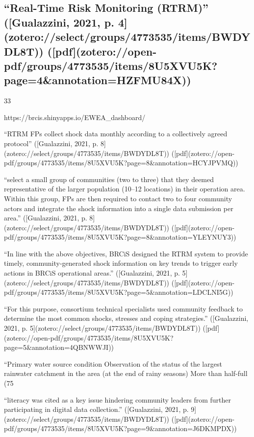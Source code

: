 {\subsection{“Real-Time Risk Monitoring (RTRM)” ([Gualazzini, 2021, p. 4](zotero://select/groups/4773535/items/BWDYDL8T)) ([pdf](zotero://open-pdf/groups/4773535/items/8U5XVU5K?page=4&annotation=HZFMU84X))}33

https://brcis.shinyapps.io/EWEA_dashboard/

“RTRM FPs collect shock data monthly according to a collectively agreed protocol” ([Gualazzini, 2021, p. 8](zotero://select/groups/4773535/items/BWDYDL8T)) ([pdf](zotero://open-pdf/groups/4773535/items/8U5XVU5K?page=8&annotation=HCYJPVMQ))

“select a small group of communities (two to three) that they deemed representative of the larger population (10–12 locations) in their operation area. Within this group, FPs are then required to contact two to four community actors and integrate the shock information into a single data submission per area.” ([Gualazzini, 2021, p. 8](zotero://select/groups/4773535/items/BWDYDL8T)) ([pdf](zotero://open-pdf/groups/4773535/items/8U5XVU5K?page=8&annotation=YLEYNUY3))

“In line with the above objectives, BRCiS designed the RTRM system to provide timely, community-generated shock information on key trends to trigger early actions in BRCiS operational areas.” ([Gualazzini, 2021, p. 5](zotero://select/groups/4773535/items/BWDYDL8T)) ([pdf](zotero://open-pdf/groups/4773535/items/8U5XVU5K?page=5&annotation=LDCLNI5G))

“For this purpose, consortium technical specialists used community feedback to determine the most common shocks, stresses and coping strategies.” ([Gualazzini, 2021, p. 5](zotero://select/groups/4773535/items/BWDYDL8T)) ([pdf](zotero://open-pdf/groups/4773535/items/8U5XVU5K?page=5&annotation=4QBNWWJI))

“Primary water source condition Observation of the status of the largest rainwater catchment in the area (at the end of rainy seasons) More than half-full (75%

“literacy was cited as a key issue hindering community leaders from further participating in digital data collection.” ([Gualazzini, 2021, p. 9](zotero://select/groups/4773535/items/BWDYDL8T)) ([pdf](zotero://open-pdf/groups/4773535/items/8U5XVU5K?page=9&annotation=J6DKMPDX))

}
